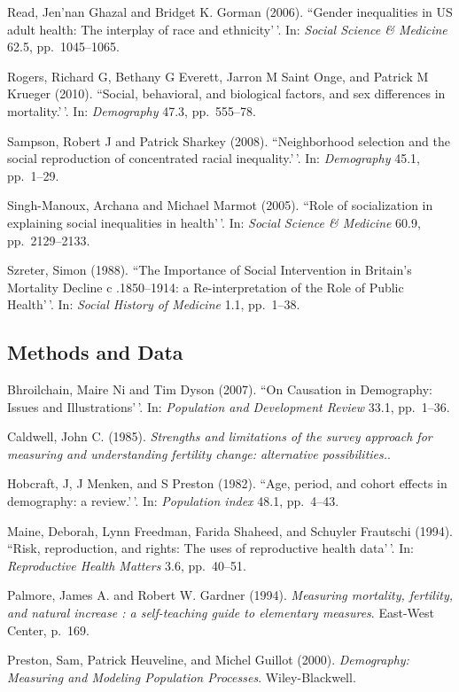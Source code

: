 \documentclass[11pt,]{article}
\begin{document}
Read, Jen'nan Ghazal and Bridget K. Gorman (2006). ``Gender inequalities
in US adult health: The interplay of race and ethnicity'\,'. In:
\emph{Social Science \& Medicine} 62.5, pp.~1045--1065.

Rogers, Richard G, Bethany G Everett, Jarron M Saint Onge, and Patrick M
Krueger (2010). ``Social, behavioral, and biological factors, and sex
differences in mortality.'\,'. In: \emph{Demography} 47.3, pp.~555--78.

Sampson, Robert J and Patrick Sharkey (2008). ``Neighborhood selection
and the social reproduction of concentrated racial inequality.'\,'. In:
\emph{Demography} 45.1, pp.~1--29.

Singh-Manoux, Archana and Michael Marmot (2005). ``Role of socialization
in explaining social inequalities in health'\,'. In:
\emph{Social Science \& Medicine} 60.9, pp.~2129--2133.

Szreter, Simon (1988). ``The Importance of Social Intervention in
Britain's Mortality Decline c .1850--1914: a Re-interpretation of the
Role of Public Health'\,'. In: \emph{Social History of Medicine} 1.1,
pp.~1--38.

\hypertarget{methods-and-data}{%
\subsection{Methods and Data}\label{methods-and-data}}

Bhroilchain, Maire Ni and Tim Dyson (2007). ``On Causation in
Demography: Issues and Illustrations'\,'. In:
\emph{Population and Development Review} 33.1, pp.~1--36.

Caldwell, John C. (1985).
\emph{Strengths and limitations of the survey approach for measuring and understanding fertility change: alternative possibilities.}.

Hobcraft, J, J Menken, and S Preston (1982). ``Age, period, and cohort
effects in demography: a review.'\,'. In: \emph{Population index} 48.1,
pp.~4--43.

Maine, Deborah, Lynn Freedman, Farida Shaheed, and Schuyler Frautschi
(1994). ``Risk, reproduction, and rights: The uses of reproductive
health data'\,'. In: \emph{Reproductive Health Matters} 3.6, pp.~40--51.

Palmore, James A. and Robert W. Gardner (1994).
\emph{Measuring mortality, fertility, and natural increase : a self-teaching guide to elementary measures}.
East-West Center, p.~169.

Preston, Sam, Patrick Heuveline, and Michel Guillot (2000).
\emph{Demography: Measuring and Modeling Population Processes}.
Wiley-Blackwell.
\end{document}
